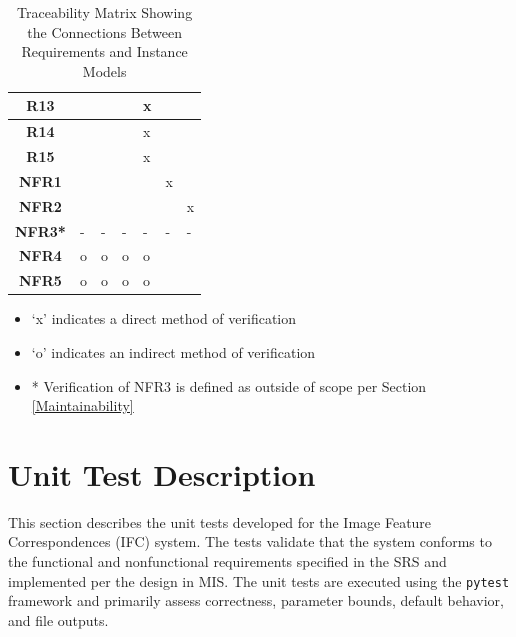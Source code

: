 \documentclass[12pt, titlepage]{article}
\begin{document}
\begin{table}[h!]
\begin{tabularx}{\textwidth}{|c|X|X|X|X|X|X|}
  \textbf{R13}  &                     &                     &                     & x                   &                     &                     \\ \hline
  \textbf{R14}  &                     &                     &                     & x                   &                     &                     \\ \hline
  \textbf{R15}  &                     &                     &                     & x                   &                     &                     \\ \hline
  \textbf{NFR1} &                     &                     &                     &                     & x                   &                     \\ \hline
  \textbf{NFR2} &                     &                     &                     &                     &                     & x                   \\ \hline
  \textbf{NFR3*}& -                    & -                   & -                   & -                   & -                   & -                   \\ \hline
  \textbf{NFR4} & o                   & o                   & o                   & o                   &                     &                     \\ \hline
  \textbf{NFR5} & o                   & o                   & o                   & o                   &                     &                     \\ \hline
  \end{tabularx}
  \caption{Traceability Matrix Showing the Connections Between Requirements and Instance Models}
  \label{Table_R_trace}
\end{table}

\begin{itemize}
\item \lq x\rq{} indicates a direct method of verification
\item \lq o\rq{} indicates an indirect method of verification
\item * Verification of NFR3 is defined as outside of scope per Section \ref{Maintainability}
\end{itemize}


\section{Unit Test Description}\label{UTD}
This section describes the unit tests developed for the Image Feature Correspondences (IFC) system. The tests validate that the system conforms to the functional and nonfunctional requirements specified in the SRS and implemented per the design in MIS. The unit tests are executed using the \texttt{pytest} framework and primarily assess correctness, parameter bounds, default behavior, and file outputs.
\end{document}

